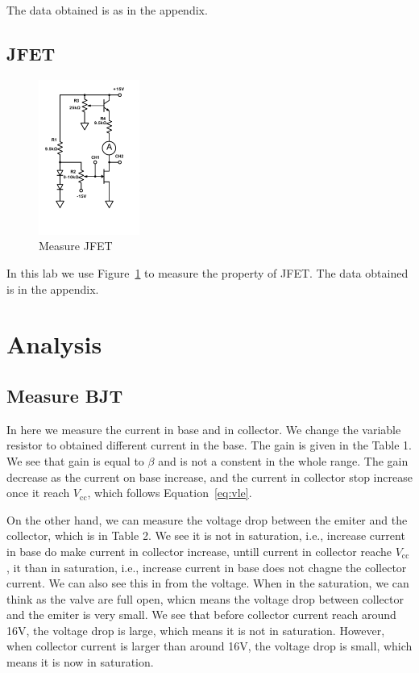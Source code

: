 \documentclass[aps,prl,reprint]{revtex4-1}
\newcommand{\vcc}{V_\text{cc}}
\begin{document}
    The data obtained is as in the appendix.

\subsection{JFET}
\begin{figure}[h]
    \centering
    \includegraphics[height=2in]{image/JFET-Measure.pdf}
    \caption{Measure JFET}
    \label{fig:jfetMeasure}
\end{figure}
In this lab we use Figure~\ref{fig:jfetMeasure} to measure the property of JFET. The data obtained is in the appendix.

\section{Analysis}
\subsection{Measure BJT}
In here we measure the current in base and in collector. We change the variable resistor to obtained different current in the base. The gain is given in the Table 1. We see that gain is equal to $\beta$ and is not a constent in the whole range. The gain decrease as the current on base increase, and the current in collector stop increase once it reach $\vcc$, which follows Equation~\ref{eq:vle}.

On the other hand, we can measure the voltage drop between the emiter and the collector, which is in Table 2. We see it is not in saturation, i.e., increase current in base do make current in collector increase, untill current in collector reache $\vcc$, it than in saturation, i.e., increase current in base does not chagne the collector current. We can also see this in from the voltage. When in the saturation, we can think as the valve are full open, whicn means the voltage drop between collector and the emiter is very small. We see that before collector current reach around 16V, the voltage drop is large, which means it is not in saturation. However, when collector current is larger than around 16V, the voltage drop is small, which means it is now in saturation.
\end{document}
